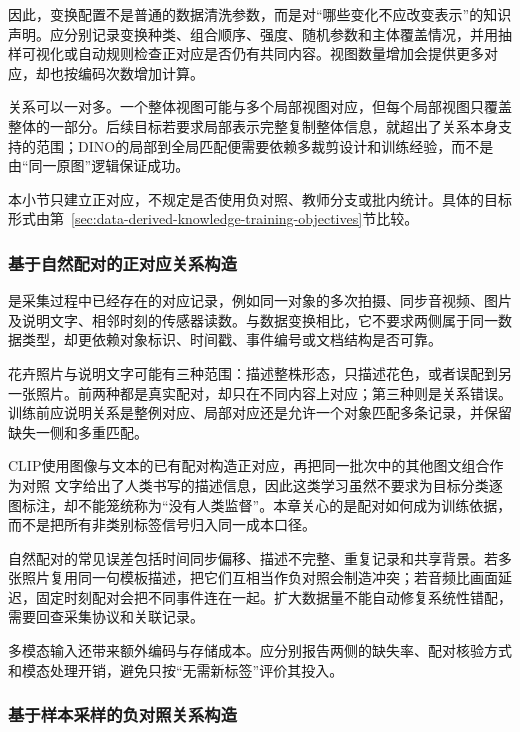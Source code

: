 因此，变换配置不是普通的数据清洗参数，而是对“哪些变化不应改变表示”的知识声明。应分别记录变换种类、组合顺序、强度、随机参数和主体覆盖情况，并用抽样可视化或自动规则检查正对应是否仍有共同内容。视图数量增加会提供更多对应，却也按编码次数增加计算。

关系可以一对多。一个整体视图可能与多个局部视图对应，但每个局部视图只覆盖整体的一部分。后续目标若要求局部表示完整复制整体信息，就超出了关系本身支持的范围；DINO的局部到全局匹配便需要依赖多裁剪设计和训练经验，而不是由“同一原图”逻辑保证成功。

本小节只建立正对应，不规定是否使用负对照、教师分支或批内统计。具体的目标形式由第~\ref{sec:data-derived-knowledge-training-objectives}节比较。

\subsubsection{基于自然配对的正对应关系构造}
\label{sec:data-derived-knowledge-natural-positive}

是采集过程中已经存在的对应记录，例如同一对象的多次拍摄、同步音视频、图片及说明文字、相邻时刻的传感器读数。与数据变换相比，它不要求两侧属于同一数据类型，却更依赖对象标识、时间戳、事件编号或文档结构是否可靠。

花卉照片与说明文字可能有三种范围：描述整株形态，只描述花色，或者误配到另一张照片。前两种都是真实配对，却只在不同内容上对应；第三种则是关系错误。训练前应说明关系是整例对应、局部对应还是允许一个对象匹配多条记录，并保留缺失一侧和多重匹配。

\Needspace{65mm}
CLIP使用图像与文本的已有配对构造正对应，再把同一批次中的其他图文组合作为对照
文字给出了人类书写的描述信息，因此这类学习虽然不要求为目标分类逐图标注，却不能笼统称为“没有人类监督”。本章关心的是配对如何成为训练依据，而不是把所有非类别标签信号归入同一成本口径。

自然配对的常见误差包括时间同步偏移、描述不完整、重复记录和共享背景。若多张照片复用同一句模板描述，把它们互相当作负对照会制造冲突；若音频比画面延迟，固定时刻配对会把不同事件连在一起。扩大数据量不能自动修复系统性错配，需要回查采集协议和关联记录。

多模态输入还带来额外编码与存储成本。应分别报告两侧的缺失率、配对核验方式和模态处理开销，避免只按“无需新标签”评价其投入。

\subsubsection{基于样本采样的负对照关系构造}
\label{sec:data-derived-knowledge-negative-sampling}


